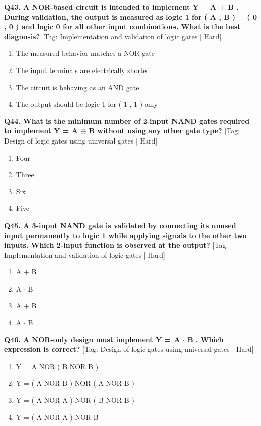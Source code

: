 \noindent\textbf{Q43. A NOR-based circuit is intended to implement Y = A + B . During validation, the output is measured as logic 1 for ( A , B ) = ( 0 , 0 ) and logic 0 for all other input combinations. What is the best diagnosis?} \hfill [Tag: Implementation and validation of logic gates | Hard]
\begin{enumerate}[label=(\alph*),topsep=2pt,itemsep=1pt,partopsep=0pt,parsep=0pt]
    \item {The measured behavior matches a NOR gate}
    \item {The input terminals are electrically shorted}
    \item {The circuit is behaving as an AND gate}
    \item {The output should be logic 1 for ( 1 , 1 ) only}
\end{enumerate}
\vspace{2mm}

\noindent\textbf{Q44. What is the minimum number of 2-input NAND gates required to implement Y = A $\oplus$ B without using any other gate type?} \hfill [Tag: Design of logic gates using universal gates | Hard]
\begin{enumerate}[label=(\alph*),topsep=2pt,itemsep=1pt,partopsep=0pt,parsep=0pt]
    \item {Four}
    \item {Three}
    \item {Six}
    \item {Five}
\end{enumerate}
\vspace{2mm}

\noindent\textbf{Q45. A 3-input NAND gate is validated by connecting its unused input permanently to logic 1 while applying signals to the other two inputs. Which 2-input function is observed at the output?} \hfill [Tag: Implementation and validation of logic gates | Hard]
\begin{enumerate}[label=(\alph*),topsep=2pt,itemsep=1pt,partopsep=0pt,parsep=0pt]
    \item {A + B}
    \item {A $\cdot$ B}
    \item {A + B}
    \item {A $\cdot$ B}
\end{enumerate}
\vspace{2mm}

\noindent\textbf{Q46. A NOR-only design must implement Y = A $\cdot$ B . Which expression is correct?} \hfill [Tag: Design of logic gates using universal gates | Hard]
\begin{enumerate}[label=(\alph*),topsep=2pt,itemsep=1pt,partopsep=0pt,parsep=0pt]
    \item {Y = A NOR ( B NOR B )}
    \item {Y = ( A NOR B ) NOR ( A NOR B )}
    \item {Y = ( A NOR A ) NOR ( B NOR B )}
    \item {Y = ( A NOR A ) NOR B}
\end{enumerate}
\vspace{2mm}


